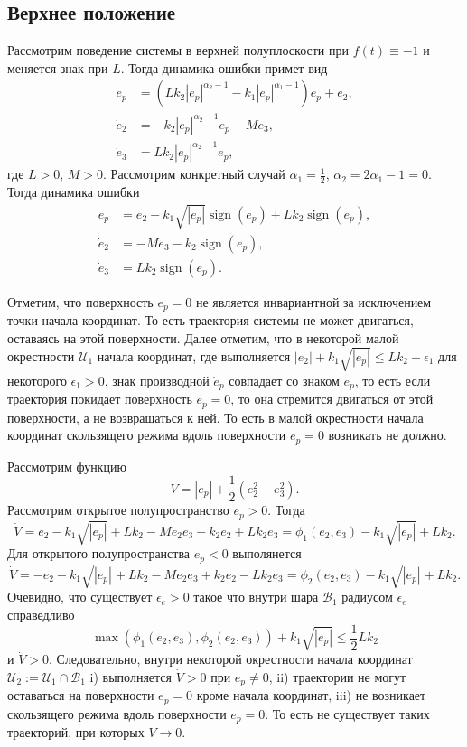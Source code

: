 \documentclass{article}
\newcommand{\sign}{\operatorname{sign}}
\begin{document}
\subsection{Верхнее положение}
Рассмотрим поведение системы в верхней полуплоскости при $f(t)\equiv -1$ и меняется знак при $L$. Тогда динамика ошибки примет вид
\[
\begin{aligned}
	\dot e_p&= (Lk_2|e_p|^{\alpha_2-1}-k_1|e_p|^{\alpha_1-1})e_p+e_2,  \\
	\dot e_2&= - k_2|e_p|^{\alpha_2-1}e_p - Me_3,\\
	\dot e_3&=  Lk_2|e_p|^{\alpha_2-1}e_p,
\end{aligned}
\]
где $L>0$, $M>0$. Рассмотрим конкретный случай $\alpha_1=\frac{1}{2}$, $\alpha_2=2\alpha_1-1=0$. Тогда динамика ошибки
\[
	\begin{aligned}
		\dot{e}_p & = e_2- k_1\sqrt{|e_p|}\sign(e_p)+Lk_2\sign(e_p), \\
		\dot{e}_2 & = -Me_3 - k_2\sign(e_p), \\
		\dot{e}_3 & = Lk_2\sign(e_p).
	\end{aligned}
\]

Отметим, что поверхность $e_p=0$ не является инвариантной за исключением точки начала координат. То есть траектория системы не может двигаться, оставаясь на этой поверхности. Далее отметим, что в некоторой малой окрестности $\mathcal{U}_1$ начала координат, где выполняется $|e_2|+k_1\sqrt{|e_p|}\le Lk_2+\epsilon_1$ для некоторого $\epsilon_1>0$, знак производной $\dot{e}_p$ совпадает со знаком $e_p$, то есть если траектория покидает поверхность $e_p=0$, то она стремится двигаться от этой поверхности, а не возвращаться к ней. То есть в малой окрестности начала координат скользящего режима вдоль поверхности $e_p=0$ возникать не должно.

Рассмотрим функцию
\[
	V = |e_p|+\frac{1}{2}\left(e_2^2+e_3^2\right).
\]
Рассмотрим открытое полупространство $e_p>0$. Тогда 
\[
	\dot{V} = e_2 - k_1\sqrt{|e_p|}+Lk_2 -Me_2e_3 - k_2e_2 + Lk_2e_3 = \phi_1(e_2,e_3)- k_1\sqrt{|e_p|}+Lk_2.
\]
Для открытого полупространства $e_p<0$ выполянется
\[
	\dot{V} = -e_2 - k_1\sqrt{|e_p|}+Lk_2 -Me_2e_3 + k_2e_2 - Lk_2e_3 = \phi_2(e_2,e_3)- k_1\sqrt{|e_p|}+Lk_2.
\]
Очевидно, что существует $\epsilon_e>0$ такое что внутри шара $\mathcal{B}_1$ радиусом $\epsilon_e$ справедливо
\[
\max\left(\phi_1(e_2,e_3),\phi_2(e_2,e_3)\right) + k_1\sqrt{|e_p|} \le \frac{1}{2}Lk_2
\]
и $\dot{V}>0$. Следовательно, внутри некоторой окрестности начала координат $\mathcal{U}_2:=\mathcal{U}_1\cap \mathcal{B}_1$ i) выполняется $\dot{V}>0$ при $e_p\ne 0$, ii) траектории не могут оставаться на поверхности $e_p=0$ кроме начала координат, iii) не возникает скользящего режима вдоль поверхности $e_p=0$. То есть не существует таких траекторий, при которых $V\to 0$.
\end{document}
